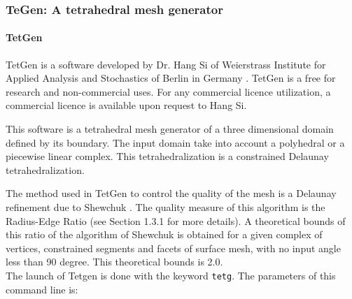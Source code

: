 \documentclass[a4paper,twoside,12pt]{book}
\begin{document}
\subsubsection{TeGen: A tetrahedral mesh generator }

\paragraph{TetGen}

TetGen is a software developed by Dr. Hang Si of Weierstrass Institute for Applied Analysis and Stochastics of
Berlin in Germany \cite{tetgen}. TetGen is a free for research and non-commercial uses. For any commercial
licence utilization, a commercial licence is available upon request to Hang Si.

This software is a tetrahedral mesh generator of a three dimensional domain defined by its boundary.
The input domain take into account a polyhedral or a piecewise linear complex.
This tetrahedralization is a constrained Delaunay tetrahedralization.

The method used in TetGen to control the quality of the mesh is a Delaunay refinement due to 
Shewchuk \cite{tetgenshewchuk}. The quality measure of this algorithm is the Radius-Edge
Ratio (see Section 1.3.1 \cite{tetgen} for more details). A theoretical bounds of this ratio of the algorithm
of Shewchuk is obtained for a given complex of vertices, constrained segments and facets of surface mesh,
with no input angle less than 90 degree. This theoretical bounds is 2.0.\\

The launch of Tetgen is done with the keyword \texttt{tetg}. The parameters of this command line is:
\end{document}
